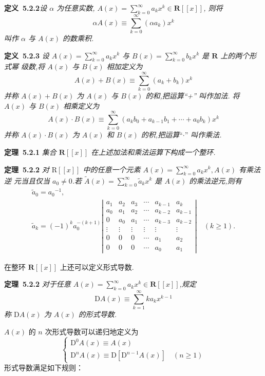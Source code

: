 \documentclass{report}
\begin{document}
\noindent
\textbf{定义\ 5.2.2}\textsl {设 $\alpha$ 为任意实数, $A(x)=\sum_{k=0}^{\infty} a_{k} x^{k} \in \mathbf{R}[[x]]$, 则将
$$
\alpha A(x) \equiv \sum_{k=0}^{\infty}\left(\alpha a_{k}\right) x^{k}
$$
叫作 $\alpha$ 与 $A(x)$ 的数乘积. }

\noindent
\textbf{定义\ 5.2.3}\textsl{ 设 $A(x)=\sum_{k=0}^{\infty} a_{k} x^{k}$ 与 $B(x)=\sum_{k=0}^{\infty} b_{k} x^{k}$ 是 $\mathbf{R}$ 上的两个形式幂 级数,将 $A(x)$ 与 $B(x)$ 相加定义为
$$
A(x)+B(x) \equiv \sum_{k=0}^{\infty}\left(a_{k}+b_{k}\right) x^{k}
$$
并称 $A(x)+B(x)$ 为 $A(x)$ 与 $B(x)$ 的和,把运算“+” 叫作加法.
将 $A(x)$ 与 $B(x)$ 相乘定义为
$$
A(x) \cdot B(x) \equiv \sum_{k=0}^{\infty}\left(a_{k} b_{0}+a_{k-1} b_{1}+\cdots+a_{0} b_{k}\right) x^{k}
$$
并称 $A(x) \cdot B(x)$ 为 $A(x)$ 和 $B(x)$ 的积,把运算$“\cdot”$ 叫作乘法. }


\noindent
\textbf{定理\ 5.2.1} \textsl{集合 $\mathbf{R}[[x]]$ 在上述加法和乘法运算下构成一个整环. }

\noindent
\textbf{定理\ 5.2.2} \textsl{对 $\mathrm{R}[[x]]$ 中的任意一个元素 $A(x)=\sum_{k=0}^{\infty} a_{k} x^{k}, A(x)$ 有乘法逆 元当且仅当 $a_{0} \neq 0$.若 $\widetilde{A}(x)=\sum_{k=0}^{\infty} \tilde{a}_{k} x^{k}$ 是 $A(x)$ 的乘法逆元,则有
$$
\begin{array}{l}
\tilde{a}_{0}=a_{0}{ }^{-1}, \\
\tilde{a}_{k}=(-1)^{k} a_{0}^{-(k+1)}\left|\begin{array}{cccccc}
a_{1} & a_{2} & a_{3} & \cdots & a_{k-1} & a_{k} \\
a_{0} & a_{1} & a_{2} & \cdots & a_{k-2} & a_{k-1} \\
0 & a_{0} & a_{1} & \cdots & a_{k-3} & a_{k-2} \\
\vdots & \vdots & \vdots & \vdots & \vdots & \vdots \\
0 & 0 & 0 & \cdots & a_{1} & a_{2} \\
0 & 0 & 0 & \cdots & a_{0} & a_{1}
\end{array}\right| \quad(k \geqslant 1) .
\end{array}
$$ }

在整环 $\mathbf{R}[[x]]$ 上还可以定义形式导数.

\noindent
\textbf{定理\ 5.2.2} \textsl{对于任意 $A(x)=\sum_{k=0}^{\infty} a_{k} x^{k} \in \mathbf{R}[[x]]$,规定$$
\mathrm{D} A(x) \equiv \sum_{k=1}^{\infty} k a_{k} x^{k-1}
$$
称 $\mathrm{D} A(x)$ 为 $A(x)$ 的形式导数.  }

$A(x)$ 的 $n$ 次形式导数可以递归地定义为
$$
\left\{\begin{array}{l}
\mathrm{D}^{0} A(x) \equiv A(x) \\
\mathrm{D}^{n} A(x) \equiv \mathrm{D}\left[\mathrm{D}^{n-1} A(x)\right] \quad(n \geqslant 1)
\end{array}\right.
$$
形式导数满足如下规则：
\end{document}
